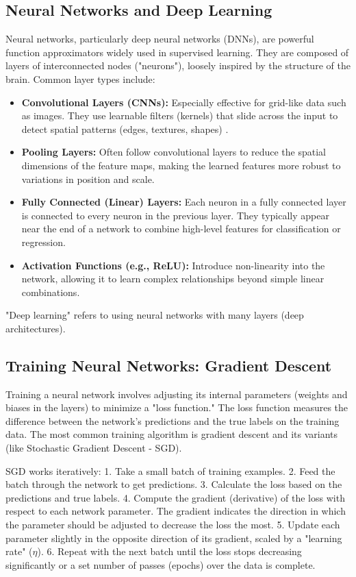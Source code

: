\documentclass[conference]{IEEEtran}
\begin{document}
\subsection{Neural Networks and Deep Learning}
Neural networks, particularly deep neural networks (DNNs), are powerful function approximators widely used in supervised learning. They are composed of layers of interconnected nodes ("neurons"), loosely inspired by the structure of the brain. Common layer types include:
\begin{itemize}
    \item \textbf{Convolutional Layers (CNNs):} Especially effective for grid-like data such as images. They use learnable filters (kernels) that slide across the input to detect spatial patterns (edges, textures, shapes) \cite{b4}.
    \item \textbf{Pooling Layers:} Often follow convolutional layers to reduce the spatial dimensions of the feature maps, making the learned features more robust to variations in position and scale.
    \item \textbf{Fully Connected (Linear) Layers:} Each neuron in a fully connected layer is connected to every neuron in the previous layer. They typically appear near the end of a network to combine high-level features for classification or regression.
    \item \textbf{Activation Functions (e.g., ReLU):} Introduce non-linearity into the network, allowing it to learn complex relationships beyond simple linear combinations.
\end{itemize}
"Deep learning" refers to using neural networks with many layers (deep architectures).

\subsection{Training Neural Networks: Gradient Descent}
Training a neural network involves adjusting its internal parameters (weights and biases in the layers) to minimize a "loss function." The loss function measures the difference between the network's predictions and the true labels on the training data. The most common training algorithm is gradient descent and its variants (like Stochastic Gradient Descent - SGD).

SGD works iteratively:
1.  Take a small batch of training examples.
2.  Feed the batch through the network to get predictions.
3.  Calculate the loss based on the predictions and true labels.
4.  Compute the gradient (derivative) of the loss with respect to each network parameter. The gradient indicates the direction in which the parameter should be adjusted to decrease the loss the most.
5.  Update each parameter slightly in the opposite direction of its gradient, scaled by a "learning rate" ($\eta$).
6.  Repeat with the next batch until the loss stops decreasing significantly or a set number of passes (epochs) over the data is complete.
\end{document}

